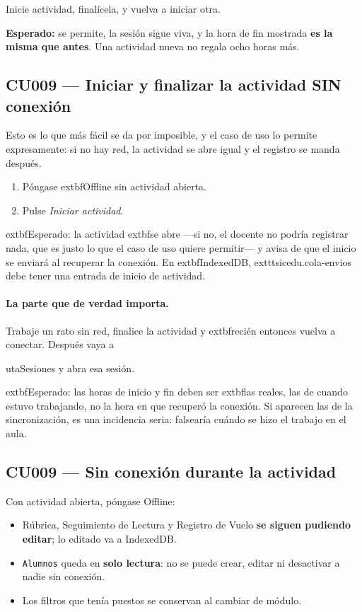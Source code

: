 \documentclass[11pt,a4paper]{article}
\newcommand{\ruta}[1]{\textcolor{azulmarino}{\texttt{#1}}}
\begin{document}
Inicie actividad, finalícela, y vuelva a iniciar otra.

\textbf{Esperado:} se permite, la sesión sigue viva, y la hora de fin mostrada
\textbf{es la misma que antes}. Una actividad nueva no regala ocho horas más.

\subsection{CU009 --- Iniciar y finalizar la actividad SIN conexión}

Esto es lo que más fácil se da por imposible, y el caso de uso lo permite
expresamente: si no hay red, la actividad se abre igual y el registro se manda
después.

\begin{enumerate}
  \item Póngase 	extbf{Offline} sin actividad abierta.
  \item Pulse \emph{Iniciar actividad}.
\end{enumerate}

	extbf{Esperado:} la actividad 	extbf{se abre} —si no, el docente no podría
registrar nada, que es justo lo que el caso de uso quiere permitir— y avisa de
que el inicio se enviará al recuperar la conexión. En 	extbf{IndexedDB},
	exttt{sicedu.cola-envios} debe tener una entrada de inicio de actividad.

\paragraph{La parte que de verdad importa.} Trabaje un rato sin red, finalice
la actividad y 	extbf{recién entonces} vuelva a conectar. Después vaya a

uta{Sesiones} y abra esa sesión.

	extbf{Esperado:} las horas de inicio y fin deben ser 	extbf{las reales, las
de cuando estuvo trabajando}, no la hora en que recuperó la conexión. Si
aparecen las de la sincronización, es una incidencia seria: falsearía cuándo se
hizo el trabajo en el aula.

\subsection{CU009 --- Sin conexión durante la actividad}

Con actividad abierta, póngase Offline:

\begin{itemize}
  \item Rúbrica, Seguimiento de Lectura y Registro de Vuelo \textbf{se siguen
        pudiendo editar}; lo editado va a IndexedDB.
  \item \ruta{Alumnos} queda en \textbf{solo lectura}: no se puede crear, editar
        ni desactivar a nadie sin conexión.
  \item Los filtros que tenía puestos se conservan al cambiar de módulo.
\end{itemize}
\end{document}
